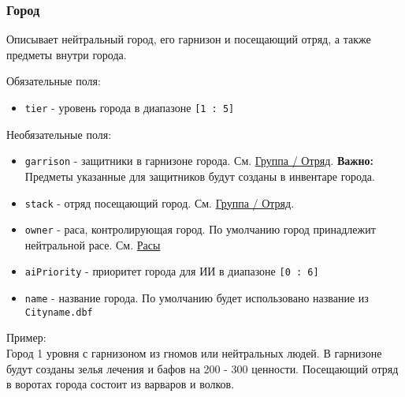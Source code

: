 \subsubsection{Город}
\label{city}
Описывает нейтральный город, его гарнизон и посещающий отряд, а также предметы внутри города.

Обязательные поля:
\begin{itemize}
\item \texttt{tier} - уровень города в диапазоне \texttt{[1 : 5]}
\end{itemize}

Необязательные поля:
\begin{itemize}
\item \texttt{garrison} - защитники в гарнизоне города. См. \hyperref[group]{Группа / Отряд}. \textbf{Важно:} Предметы указанные для защитников будут созданы в инвентаре города.
\item \texttt{stack} - отряд посещающий город. См. \hyperref[group]{Группа / Отряд}.
\item \texttt{owner} - раса, контролирующая город. По умолчанию город принадлежит нейтральной расе. См. \hyperref[raceTypes]{Расы}
\item \texttt{aiPriority} - приоритет города для ИИ в диапазоне \texttt{[0 : 6]}
\item \texttt{name} - название города. По умолчанию будет использовано название из \texttt{Cityname.dbf}
\end{itemize}

Пример:\\
Город 1 уровня с гарнизоном из гномов или нейтральных людей.
В гарнизоне будут созданы зелья лечения и бафов на 200 - 300 ценности.
Посещающий отряд в воротах города состоит из варваров и волков.

\begin{figure}[H]

\end{figure}